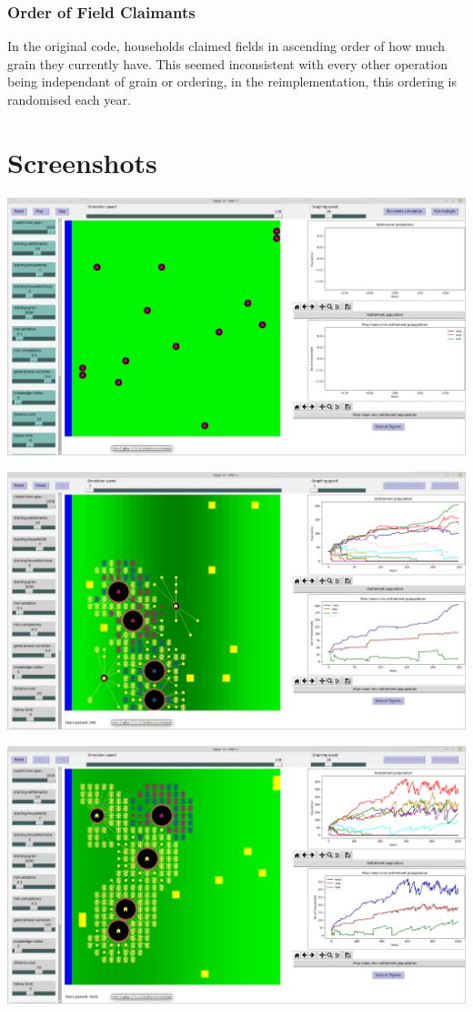 \documentclass[12pt]{article}
\begin{document}
			\subsubsection{Order of Field Claimants}
				In the original code, households claimed fields in ascending order of how much grain they currently have. This seemed inconsistent with every other operation being independant of grain or ordering, in the reimplementation, this ordering is randomised each year.
	\section{Screenshots}
		\includegraphics[width=\linewidth]{OnOpen}
		
		\includegraphics[width=\linewidth]{WhileRunning}
		
		\includegraphics[width=\linewidth]{FinishedRunning}
		
\end{document}
